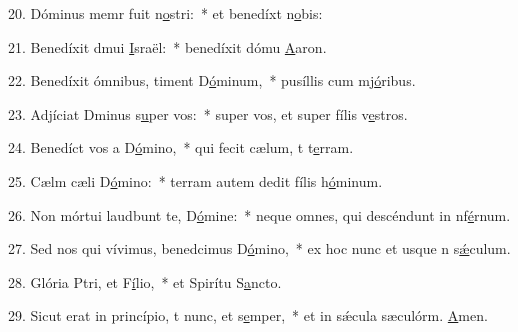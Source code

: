 20. Dóminus memr fuit n\uline{o}stri:~* et benedíxt n\uline{o}bis:\par 
21. Benedíxit dmui \uline{I}sraël:~* benedíxit dómu \uline{A}aron.\par 
22. Benedíxit ómnibus,  timent D\uline{ó}minum,~* pusíllis cum mj\uline{ó}ribus.\par 
23. Adjíciat Dminus s\uline{u}per vos:~* super vos, et super fílis v\uline{e}stros.\par 
24. Benedíct vos a D\uline{ó}mino,~* qui fecit cælum, t t\uline{e}rram.\par 
25. Cælm cæli D\uline{ó}mino:~* terram autem dedit fílis h\uline{ó}minum.\par 
26. Non mórtui laudbunt te, D\uline{ó}mine:~* neque omnes, qui descéndunt in nf\uline{é}rnum.\par 
27. Sed nos qui vívimus, benedcimus D\uline{ó}mino,~* ex hoc nunc et usque n s\uline{ǽ}culum.\par 
28. Glória Ptri, et F\uline{í}lio,~* et Spirítu S\uline{a}ncto.\par 
29. Sicut erat in princípio, t nunc, et s\uline{e}mper,~* et in sǽcula sæculórm. \uline{A}men.\par 
